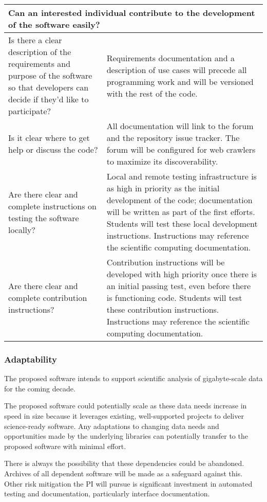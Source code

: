 \begin{tabularx}{\textwidth}{XX}
    \multicolumn{2}{l}{Can an interested individual contribute to the development of the software easily?}\\
\toprule

    Is there a clear description of the requirements and purpose of the software so that developers can decide if they'd like to participate?
    & Requirements documentation and a description of use cases will precede all programming work and will be versioned with the rest of the code.\\
    Is it clear where to get help or discuss the code?
    & All documentation will link to the forum and the repository issue tracker.  The forum will be configured for web crawlers to maximize its discoverability.\\
    Are there clear and complete instructions on testing the software locally?
    & Local and remote testing infrastructure is as high in priority as the initial development of the code; documentation will be written as part of the first efforts.  Students will test these local development instructions.  Instructions may reference the scientific computing documentation.\\
    Are there clear and complete contribution instructions?
    & Contribution instructions will be developed with high priority once there is an initial passing test, even before there is functioning code.  Students will test these contribution instructions.  Instructions may reference the scientific computing documentation.\\
    \bottomrule
\end{tabularx}


\subsubsection*{Adaptability}
The proposed software intends to support scientific analysis of gigabyte-scale data for the coming decade.

The proposed software could potentially scale as these data needs increase in speed in size because  it leverages existing, well-supported projects to deliver science-ready software.  Any adaptations to changing data needs and opportunities made by the underlying libraries can potentially transfer to the proposed software with minimal effort.

There is always the possibility that these dependencies could be abandoned.  Archives of all dependent software will be made as a safeguard against this.  Other risk mitigation the PI will pursue is significant investment in automated testing and documentation, particularly interface documentation.

